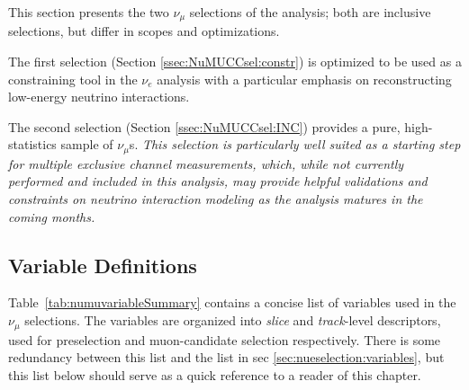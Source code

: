 \label{sec:NuMUCCsel}

\par This section presents the two $\nu_{\mu}$ selections of the analysis; both are inclusive selections, but differ in scopes and optimizations. 

The first selection (Section \ref{ssec:NuMUCCsel:constr}) is optimized to be used as a constraining tool in the $\nu_e$ analysis with a particular emphasis on reconstructing low-energy neutrino interactions. 

The second selection (Section \ref{ssec:NuMUCCsel:INC}) provides a pure, high-statistics sample of $\nu_{\mu}$s. \emph{This selection is particularly well suited as a starting step for multiple exclusive channel measurements, which, while not currently performed and included in this analysis, may provide helpful validations and constraints on neutrino interaction modeling as the analysis matures in the coming months.}


\subsection{Variable Definitions}
\label{ssec:NuMUCCsel:sel:vars}

\par Table~\ref{tab:numuvariableSummary} contains a concise list of variables used in the $\nu_{\mu}$ selections. The variables are organized into \textit{slice} and \textit{track}-level descriptors, used for preselection and muon-candidate selection respectively. There is some redundancy between this list and the list in sec \ref{sec:nueselection:variables}, but this list below should serve as a quick reference to a reader of this chapter.


